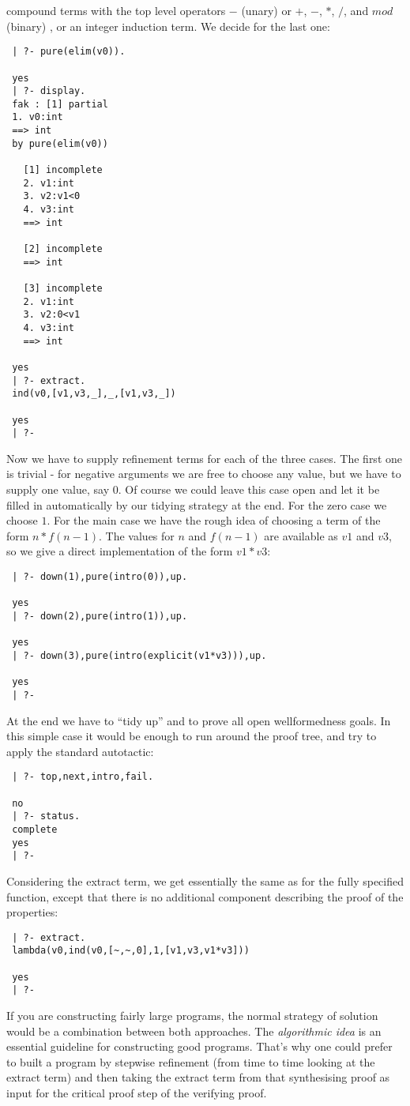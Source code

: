 \documentclass[11pt]{report}
\begin{document}
 compound terms
 with the top level operators $-$ (unary) or $+$, $-$, $*$, $/$, and
 $mod$ (binary) , or an integer induction term. We decide for the
 last one:  
 \small\begin{verbatim}
 | ?- pure(elim(v0)).
 
 yes
 | ?- display.
 fak : [1] partial 
 1. v0:int
 ==> int
 by pure(elim(v0))
 
   [1] incomplete
   2. v1:int
   3. v2:v1<0
   4. v3:int
   ==> int
 
   [2] incomplete
   ==> int
 
   [3] incomplete
   2. v1:int
   3. v2:0<v1
   4. v3:int
   ==> int
 
 yes
 | ?- extract.
 ind(v0,[v1,v3,_],_,[v1,v3,_])
 
 yes
 | ?- \end{verbatim}\normalsize
 Now we have to supply refinement terms for each of the three
 cases. The first one is trivial - for negative arguments we 
 are free to choose any value, but we have to supply one value,
 say $0$. Of course we could leave this case open and let it be filled
 in automatically by our tidying strategy at the end.
 For the zero case we choose $1$. For the main case we have the
 rough idea of choosing a term of the form  $n*f(n-1)$. The values
 for $n$ and $f(n-1)$ are available as $v1$ and $v3$, so we
 give a direct implementation of the form $v1*v3$:
 \small\begin{verbatim}
 | ?- down(1),pure(intro(0)),up.
 
 yes
 | ?- down(2),pure(intro(1)),up.
 
 yes
 | ?- down(3),pure(intro(explicit(v1*v3))),up.
 
 yes
 | ?- \end{verbatim}\normalsize
 At the end we have to ``tidy up'' and to prove all open wellformedness
 goals. In this simple case it would be enough to run around the
 proof tree, and try to apply the standard autotactic:
 \small\begin{verbatim}
 | ?- top,next,intro,fail.
 
 no 
 | ?- status.
 complete 
 yes
 | ?- \end{verbatim}\normalsize
 Considering the extract term, we get essentially the same
 as for the fully specified function, except that there is
 no additional component describing the proof of the properties:
 \small\begin{verbatim}
 | ?- extract.
 lambda(v0,ind(v0,[~,~,0],1,[v1,v3,v1*v3]))
 
 yes
 | ?- \end{verbatim}\normalsize
 If you are constructing fairly large programs, the normal strategy 
 of solution would be a combination between both approaches.
 The \emph{algorithmic idea} is an essential guideline for
 constructing good programs. That's why one could prefer to
 built a program by stepwise refinement (from time to time
 looking at the extract term) and then taking the extract term
 from that synthesising proof as input for the critical proof
 step of the verifying proof.
 
 \printindex
 
\end{document}
